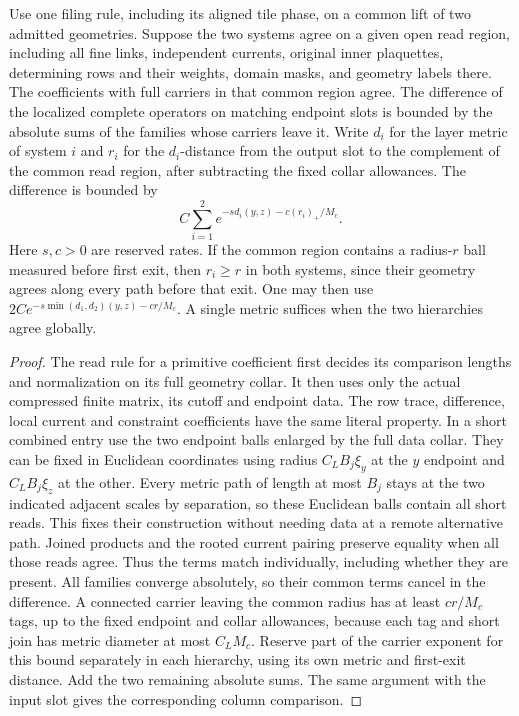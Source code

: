 \documentclass[11pt,letterpaper,reqno]{amsart}
\makeatletter
\numberwithin{equation}{section}
\theoremstyle{definition}
\newcommand{\ms@majorstart}{%
  \pushQED{\qed}\renewcommand{\qedsymbol}{$\blacksquare\square$}}
\newenvironment{corollary}[1][]{\ms@majorstart\ms@corollary[#1]}
  {\popQED\endms@corollary}
\theoremstyle{remark}
\makeatother
\begin{document}
\begin{corollary}[Comparison of determining data]
\label{mb:cor-determining-comparison}
Use one filing rule, including its aligned tile phase, on a common lift of two admitted geometries. Suppose the two systems agree on a given open read region, including all fine links, independent currents, original inner plaquettes, determining rows and their weights, domain masks, and geometry labels there. The coefficients with full carriers in that common region agree. The difference of the localized complete operators on matching endpoint slots is bounded by the absolute sums of the families whose carriers leave it. Write $d_i$ for the layer metric of system $i$ and $r_i$ for the $d_i$-distance from the output slot to the complement of the common read region, after subtracting the fixed collar allowances. The difference is bounded by
\[
 C\sum_{i=1}^2 e^{-s d_i(y,z)-c(r_i)_+/M_c}.
\]
Here $s,c>0$ are reserved rates. If the common region contains a radius-$r$ ball measured before first exit, then $r_i\ge r$ in both systems, since their geometry agrees along every path before that exit. One may then use $2C e^{-s\min(d_1,d_2)(y,z)-cr/M_c}$. A single metric suffices when the two hierarchies agree globally.
\end{corollary}

\begin{proof}
The read rule for a primitive coefficient first decides its comparison lengths and normalization on its full geometry collar. It then uses only the actual compressed finite matrix, its cutoff and endpoint data. The row trace, difference, local current and constraint coefficients have the same literal property. In a short combined entry use the two endpoint balls enlarged by the full data collar. They can be fixed in Euclidean coordinates using radius \(C_L B_j\xi_y\) at the \(y\) endpoint and \(C_L B_j\xi_z\) at the other. Every metric path of length at most \(B_j\) stays at the two indicated adjacent scales by separation, so these Euclidean balls contain all short reads. This fixes their construction without needing data at a remote alternative path. Joined products and the rooted current pairing preserve equality when all those reads agree. Thus the terms match individually, including whether they are present. All families converge absolutely, so their common terms cancel in the difference. A connected carrier leaving the common radius has at least \(c r/M_c\) tags, up to the fixed endpoint and collar allowances, because each tag and short join has metric diameter at most \(C_L M_c\). Reserve part of the carrier exponent for this bound separately in each hierarchy, using its own metric and first-exit distance. Add the two remaining absolute sums. The same argument with the input slot gives the corresponding column comparison.
\end{proof}
\end{document}
